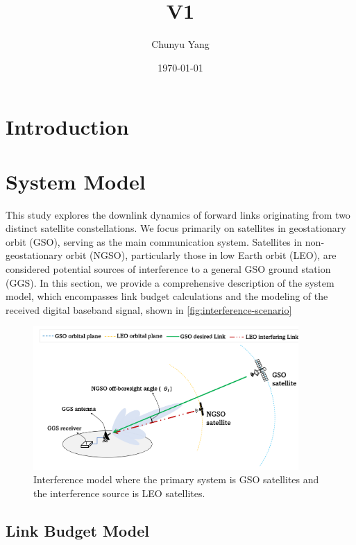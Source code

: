 \documentclass[12pt]{article}
\title{V1}
\author{Chunyu Yang}
\date{\today}
\begin{document}
\maketitle

\section{Introduction}

\section{System Model}

This study explores the downlink dynamics of forward links originating from two distinct satellite constellations. We focus primarily on satellites in geostationary orbit (GSO), serving as the main communication system. Satellites in non-geostationary orbit (NGSO), particularly those in low Earth orbit (LEO), are considered potential sources of interference to a general GSO ground station (GGS). In this section, we provide a comprehensive description of the system model, which encompasses link budget calculations and the modeling of the received digital baseband signal, shown in \autoref{fig:interference-scenario}

\begin{figure}[htbp]
    \centering
    \includegraphics[width=0.9\textwidth]{ngso-gso-interference.png}
    \caption{Interference model where the primary system is GSO satellites and the interference source is LEO satellites.}
    \label{fig:interference-scenario}
\end{figure}

\subsection{Link Budget Model}
\end{document}
